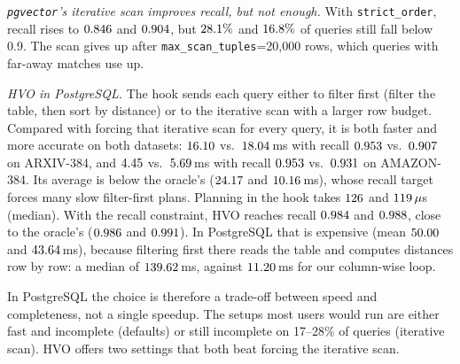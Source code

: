 \documentclass[sigconf,nonacm]{acmart}
\begin{document}
\emph{\texttt{pgvector}'s iterative scan improves recall, but not enough.} With \texttt{strict\_order}, recall rises to $0.846$ and $0.904$, but $28.1\%$ and $16.8\%$ of queries still fall below 0.9. The scan gives up after \texttt{max\_scan\_tuples}=20{,}000 rows, which queries with far-away matches use up.

\emph{HVO in PostgreSQL.} The hook sends each query either to filter first (filter the table, then sort by distance) or to the iterative scan with a larger row budget. Compared with forcing that iterative scan for every query, it is both faster and more accurate on both datasets: $16.10$ vs.\ $18.04$\,ms with recall $0.953$ vs.\ $0.907$ on ARXIV-384, and $4.45$ vs.\ $5.69$\,ms with recall $0.953$ vs.\ $0.931$ on AMAZON-384. Its average is below the oracle's ($24.17$ and $10.16$\,ms), whose recall target forces many slow filter-first plans. Planning in the hook takes $126$ and $119\,\mu$s (median). With the recall constraint, HVO reaches recall $0.984$ and $0.988$, close to the oracle's ($0.986$ and $0.991$). In PostgreSQL that is expensive (mean $50.00$ and $43.64$\,ms), because filtering first there reads the table and computes distances row by row: a median of $139.62$\,ms, against $11.20$\,ms for our column-wise loop.

In PostgreSQL the choice is therefore a trade-off between speed and completeness, not a single speedup. The setups most users would run are either fast and incomplete (defaults) or still incomplete on 17--28\% of queries (iterative scan). HVO offers two settings that both beat forcing the iterative scan.
\end{document}
